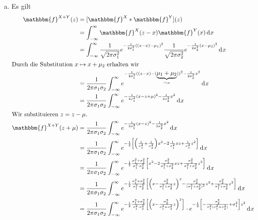\documentclass[uebung]{lecture}
\begin{document}
\begin{aufgabe}
    \begin{enumerate}[(a)]
        \item Es gilt 
        \begin{align*}
            \mathbbm{f}^{X + Y}(z) &= [\mathbbm{f}^X * \mathbbm{f}^Y](z)\\
            &= \int_{-\infty}^\infty \mathbbm{f}^X(z-x) \mathbbm{f}^Y(x)\d {x}\\
            &= \int_{-\infty}^\infty \frac{1}{\sqrt{2\pi \sigma_1^2}}e^{-\frac{1}{2\sigma_1^2}((z- x) - \mu_1)^2}\frac{1}{\sqrt{2\pi \sigma_2^2}}e^{-\frac{1}{2\sigma_2^2}(x - \mu_2)^2} \d{x}\\
            \intertext{Durch die Substitution $x \mapsto x + \mu_2$ erhalten wir}
            &= \frac{1}{2\pi\sigma_1\sigma_2} \int_{-\infty}^\infty e^{-\frac{1}{2\sigma_1^2}((z- x) - (\underbrace{\mu_1 + \mu_2}_{\eqqcolon \mu}))^2 -\frac{1}{2\sigma_2^2}x^2} \d{x}\\
            &= \frac{1}{2\pi\sigma_1\sigma_2} \int_{-\infty}^\infty e^{-\frac{1}{2\sigma_1^2}(x - z + \mu)^2 -\frac{1}{2\sigma_2^2}x^2} \d{x}\\
            \intertext{Wir substituieren $z = z - \mu$. }
            \mathbbm{f}^{X + Y}(z + \mu) &= \frac{1}{2\pi\sigma_1\sigma_2} \int_{-\infty}^\infty e^{-\frac{1}{2\sigma_1^2}(x - z)^2 -\frac{1}{2\sigma_2^2}x^2} \d{x}\\
            &= \frac{1}{2\pi\sigma_1\sigma_2} \int_{-\infty}^\infty e^{-\frac{1}{2} \left[\left(\frac{1}{\sigma_1^2} + \frac{1}{\sigma_2^2}\right)x^2 - 2\frac{1}{\sigma_1^2} xz + \frac{1}{\sigma_1^2}z^2 \right]} \d{x}\\
            &= \frac{1}{2\pi\sigma_1\sigma_2} \int_{-\infty}^\infty e^{-\frac{1}{2}\frac{\sigma_1^2 + \sigma_2^2}{\sigma_1^2\cdot \sigma_2^2}\left[x^2 - 2\frac{\sigma_2^2}{\sigma_1^2 + \sigma_2^2} xz + \frac{\sigma_2^2}{\sigma_1^2 + \sigma_2^2}z^2 \right]} \d{x}\\
            &= \frac{1}{2\pi\sigma_1\sigma_2} \int_{-\infty}^\infty e^{-\frac{1}{2}\frac{\sigma_1^2 + \sigma_2^2}{\sigma_1^2\cdot \sigma_2^2}\left[\left(x - \frac{\sigma_2^2}{\sigma_1^2 + \sigma_2^2} z\right)^2 - \frac{\sigma_2^4}{(\sigma_1^2 + \sigma_2^2)^2}z^2 + \frac{\sigma_2^2}{\sigma_1^2 + \sigma_2^2}z^2\right] } \d{x}\\
            &= \frac{1}{2\pi\sigma_1\sigma_2} \int_{-\infty}^\infty e^{-\frac{1}{2}\frac{\sigma_1^2 + \sigma_2^2}{\sigma_1^2\cdot \sigma_2^2}\left[\left(x - \frac{\sigma_2^2}{\sigma_1^2 + \sigma_2^2} z\right)^2\right]} \cdot e^{- \frac{1}{2} \left[- \frac{\sigma_2^2}{\sigma_1^2(\sigma_1^2 + \sigma_2^2)} + \sigma_1^2\right]z^2} \d{x}

\end{align*}
\end{enumerate}
\end{aufgabe}
\end{document}
